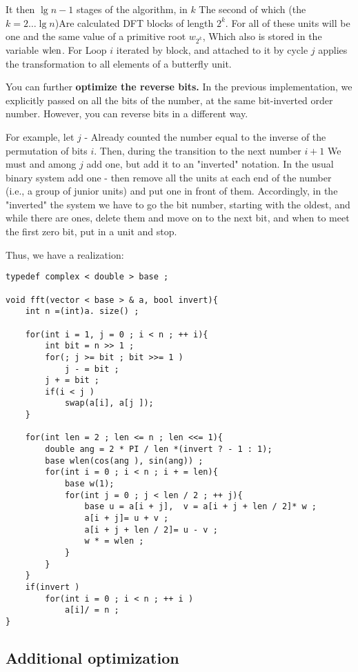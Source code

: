 It then $\lg n - 1$ stages of the algorithm, in $k$ The second of which (the $k = 2 \ldots \lg n$)Are calculated DFT blocks of length $2 ^ k$. For all of these units will be one and the same value of a primitive root $w_ {2 ^ k}$, Which also is stored in the variable $\rm wlen$. For Loop $i$ iterated by block, and attached to it by cycle $j$ applies the transformation to all elements of a butterfly unit.

You can further \textbf{optimize the reverse bits.} In the previous implementation, we explicitly passed on all the bits of the number, at the same bit-inverted order number. However, you can reverse bits in a different way.

For example, let $j$ - Already counted the number equal to the inverse of the permutation of bits $i$. Then, during the transition to the next number $i +1$ We must and among $j$ add one, but add it to an "inverted" notation. In the usual binary system add one - then remove all the units at each end of the number (i.e., a group of junior units) and put one in front of them. Accordingly, in the "inverted" the system we have to go the bit number, starting with the oldest, and while there are ones, delete them and move on to the next bit, and when to meet the first zero bit, put in a unit and stop.

Thus, we have a realization:

\begin{verbatim}
typedef complex < double > base ;
 
void fft(vector < base > & a, bool invert){
    int n =(int)a. size() ;
 
    for(int i = 1, j = 0 ; i < n ; ++ i){
        int bit = n >> 1 ;
        for(; j >= bit ; bit >>= 1 )
            j - = bit ;
        j + = bit ;
        if(i < j )
            swap(a[i], a[j ]);
    }
 
    for(int len = 2 ; len <= n ; len <<= 1){
        double ang = 2 * PI / len *(invert ? - 1 : 1);
        base wlen(cos(ang ), sin(ang)) ;
        for(int i = 0 ; i < n ; i + = len){
            base w(1);
            for(int j = 0 ; j < len / 2 ; ++ j){
                base u = a[i + j],  v = a[i + j + len / 2]* w ;
                a[i + j]= u + v ;
                a[i + j + len / 2]= u - v ;
                w * = wlen ;
            }
        }
    }
    if(invert )
        for(int i = 0 ; i < n ; ++ i )
            a[i]/ = n ;
} 
\end{verbatim}
\subsection{ Additional optimization }

